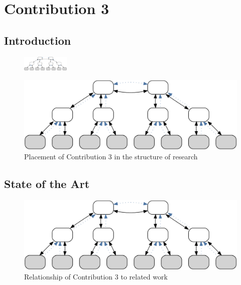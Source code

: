 \chapter{Contribution 3}\label{sec:contrib3}\minitoc\vspace{.5cm}

\section{Introduction}

\begin{figure}
    \centering
    \includegraphics[width=0.2\textwidth]{resources/images/example3}
\end{figure}



\begin{figure}[H]
    \centering
    \includegraphics[width=.55\textwidth]{resources/images/example3}
    \caption{Placement of Contribution 3 in the structure of research}\label{fig:hourglass:contrib3}
\end{figure}

\section{State of the Art}


\begin{figure}[htbp]
    \centering
    \includegraphics[width=.6\textwidth]{resources/images/example3}
    \caption{Relationship of Contribution 3 to related work}\label{fig:contrib3:related}
\end{figure}

